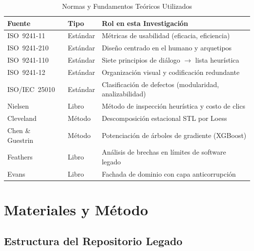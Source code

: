 \documentclass[conference]{IEEEtran}
\begin{document}
\begin{table}[!t]
\caption{Normas y Fundamentos Te\'oricos Utilizados}
\label{tab:sources}
\centering
\footnotesize
\begin{tabularx}{\columnwidth}{@{}p{2.3cm}p{1.4cm}X@{}}
\toprule
\textbf{Fuente} & \textbf{Tipo} & \textbf{Rol en esta Investigaci\'on} \\
\midrule
ISO~9241-11 & Est\'andar & M\'etricas de usabilidad (eficacia, eficiencia) \\
\addlinespace
ISO~9241-210 & Est\'andar & Dise\~no centrado en el humano y arquetipos \\
\addlinespace
ISO~9241-110 & Est\'andar & Siete principios de di\'alogo $\to$ lista heur\'istica \\
\addlinespace
ISO~9241-12 & Est\'andar & Organizaci\'on visual y codificaci\'on redundante \\
\addlinespace
ISO/IEC~25010 & Est\'andar & Clasificaci\'on de defectos (modularidad, analizabilidad) \\
\addlinespace
Nielsen~\cite{Nielsen1993} & Libro & M\'etodo de inspecci\'on heur\'istica y costo de clics \\
\addlinespace
Cleveland~\cite{Cleveland1990} & M\'etodo & Descomposici\'on estacional STL por Loess \\
\addlinespace
Chen \& Guestrin~\cite{ChenGuestrin2016} & M\'etodo & Potenciaci\'on de \'arboles de gradiente (XGBoost) \\
\addlinespace
Feathers~\cite{Feathers2004} & Libro & An\'alisis de brechas en l\'imites de software legado \\
\addlinespace
Evans~\cite{Evans2003} & Libro & Fachada de dominio con capa anticorrupci\'on \\
\bottomrule
\end{tabularx}
\end{table}

\section{Materiales y M\'etodo}
\label{sec:method}

\subsection{Estructura del Repositorio Legado}
\end{document}

